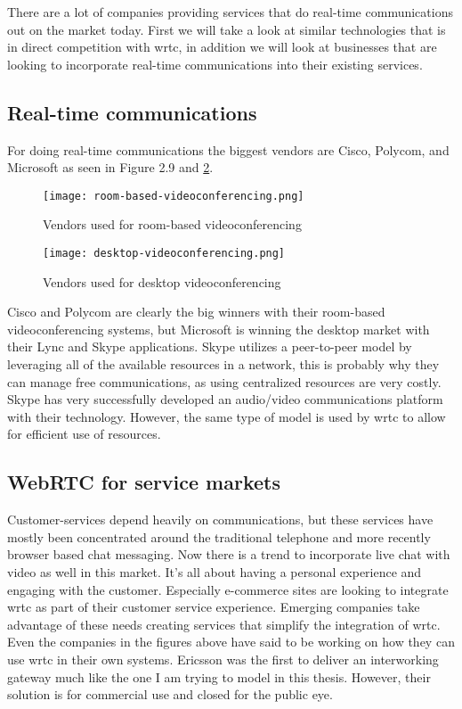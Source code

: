 There are a lot of companies providing services that do real-time communications out on the market today. First we will take a look at similar technologies\cite{lopez_fernandez_catalysing_2013} that is in direct competition with \gls{wrtc}, in addition we will look at businesses that are looking to incorporate real-time communications into their existing services.

\subsection{Real-time communications}
For doing real-time communications the biggest vendors are Cisco, Polycom, and Microsoft as seen in Figure 2.9 and \ref{fig:desktop-videoconferencing}.

\begin{figure}[here]
\centerline{\texttt{[image: room-based-videoconferencing.png]}}
\label{fig:room-based-videoconferencing}
\caption{Vendors used for room-based videoconferencing}
\end{figure}

\begin{figure}[here]
\centerline{\texttt{[image: desktop-videoconferencing.png]}}
\caption{Vendors used for desktop videoconferencing}
\label{fig:desktop-videoconferencing}
\end{figure}

Cisco and Polycom are clearly the big winners with their room-based videoconferencing systems, but Microsoft is winning the desktop market with their Lync and Skype applications. Skype utilizes a peer-to-peer model by leveraging all of the available resources in a network, this is probably why they can manage free communications, as using centralized resources are very costly. Skype has very successfully developed an audio/video communications platform with their technology. However, the same type of model is used by \gls{wrtc} to allow for efficient use of resources.

\subsection{WebRTC for service markets}
Customer-services depend heavily on communications, but these services have mostly been concentrated around the traditional telephone and more recently browser based chat messaging. Now there is a trend to incorporate live chat with video as well in this market\cite{amazon_mayday}. It's all about having a personal experience and engaging with the customer. Especially e-commerce sites are looking to integrate \gls{wrtc} as part of their customer service experience. Emerging companies take advantage of these needs creating services that simplify the integration of \gls{wrtc}. Even the companies in the figures above have said to be working on how they can use \gls{wrtc} in their own systems\cite{polycom-webrtc}. Ericsson was the first to deliver an interworking gateway\cite{ericsson-gateway} much like the one I am trying to model in this thesis. However, their solution is for commercial use and closed for the public eye.

